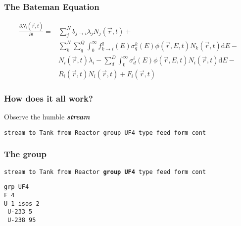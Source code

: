 \documentclass{beamer}
\begin{document}
\begin{frame}
\frametitle{The Bateman Equation}

    \begin{equation}
    \begin{split}
        \frac{\partial N_{i}(\vec{r},t)}{\partial t} = & \sum \limits_{j}^{N} 
        b_{j \rightarrow i} \lambda_{j} N_{j}(\vec{r}, t) + \\
        & \sum \limits_{k}^{N}
        \sum \limits_{q}^{Q} \int_{0}^{\infty} f_{k \rightarrow i}^{q}(E)
        \sigma_{q}^{k}(E) \phi(\vec{r},E,t) N_{k}(\vec{r},t)\mathrm{d}E - \\
        & N_{i}(\vec{r},t) \lambda_{i} - \sum \limits_{d}^{D} \int_{0}^{\infty}
        \sigma_{d}^{i}(E) \phi(\vec{r},E,t) N_{i}(\vec{r},t)\mathrm{d}E - \\
        & R_{i}(\vec{r},t) N_{i}(\vec{r},t) + F_{i}(\vec{r},t)
    \end{split}
    \end{equation}

\end{frame}

\begin{frame}
\frametitle{How does it all work?}

Observe the humble \textbf{\textit{stream}}

\hspace{2cm}

\small{\texttt{stream to Tank from Reactor group UF4 type feed form cont}}

\end{frame}

\begin{frame}
\frametitle{The group}

\small{\texttt{stream to Tank from Reactor \textbf{group UF4} type feed form cont}}

\hspace{2cm}

\texttt{grp UF4}\\
\texttt{F   4}\\
\texttt{U   1   isos    2}\\
\texttt{    U-233    5}\\
\texttt{    U-238   95}

\end{frame}
\end{document}
